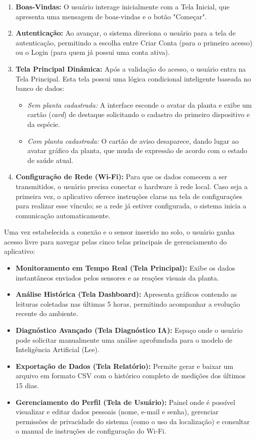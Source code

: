 \documentclass[
	12pt,
	article,
	oneside,
	a4paper,
	english,
	brazil
	]{abntex2}
\begin{document}
\begin{enumerate}
    \item \textbf{Boas-Vindas:} O usuário interage inicialmente com a Tela Inicial, que apresenta uma mensagem de boas-vindas e o botão "Começar".
    \item \textbf{Autenticação:} Ao avançar, o sistema direciona o usuário para a tela de autenticação, permitindo a escolha entre Criar Conta (para o primeiro acesso) ou o Login (para quem já possui uma conta ativa).
    \item \textbf{Tela Principal Dinâmica:} Após a validação do acesso, o usuário entra na Tela Principal. Esta tela possui uma lógica condicional inteligente baseada no banco de dados:
    \begin{itemize}
        \item \textit{Sem planta cadastrada:} A interface esconde o avatar da planta e exibe um cartão (\textit{card}) de destaque solicitando o cadastro do primeiro dispositivo e da espécie.
        \item \textit{Com planta cadastrada:} O cartão de aviso desaparece, dando lugar ao avatar gráfico da planta, que muda de expressão de acordo com o estado de saúde atual.
    \end{itemize}
    \item \textbf{Configuração de Rede (Wi-Fi):} Para que os dados comecem a ser transmitidos, o usuário precisa conectar o hardware à rede local. Caso seja a primeira vez, o aplicativo oferece instruções claras na tela de configurações para realizar esse vínculo; se a rede já estiver configurada, o sistema inicia a comunicação automaticamente.
\end{enumerate}

Uma vez estabelecida a conexão e o sensor inserido no solo, o usuário ganha acesso livre para navegar pelas cinco telas principais de gerenciamento do aplicativo:

\begin{itemize}
    \item \textbf{Monitoramento em Tempo Real (Tela Principal):} Exibe os dados instantâneos enviados pelos sensores e as reações visuais da planta.
    \item \textbf{Análise Histórica (Tela Dashboard):} Apresenta gráficos contendo as leituras coletadas nas últimas 5 horas, permitindo acompanhar a evolução recente do ambiente.
    \item \textbf{Diagnóstico Avançado (Tela Diagnóstico IA):} Espaço onde o usuário pode solicitar manualmente uma análise aprofundada para o modelo de Inteligência Artificial (Lee).
    \item \textbf{Exportação de Dados (Tela Relatório):} Permite gerar e baixar um arquivo em formato CSV com o histórico completo de medições dos últimos 15 dias.
    \item \textbf{Gerenciamento do Perfil (Tela de Usuário):} Painel onde é possível visualizar e editar dados pessoais (nome, e-mail e senha), gerenciar permissões de privacidade do sistema (como o uso da localização) e consultar o manual de instruções de configuração do Wi-Fi.
\end{itemize}
\end{document}
